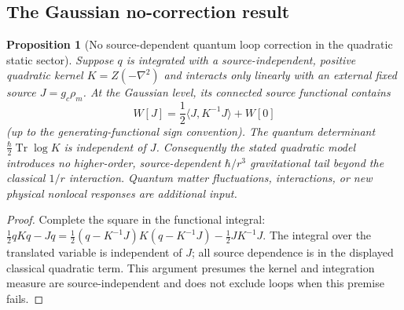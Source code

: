 \documentclass[11pt,a4paper]{article}
\newtheorem{proposition}[theorem]{Proposition}
\theoremstyle{remark}\newtheorem{remark}[theorem]{Remark}
\begin{document}
\subsection{The Gaussian no-correction result}
\begin{proposition}[No source-dependent quantum loop correction in the quadratic static sector]
Suppose $q$ is integrated with a source-independent, positive quadratic kernel
$K=Z(-\nabla^2)$ and interacts only linearly with an external fixed source
$J=g_c\rho_m$. At the Gaussian level, its connected source functional contains
\begin{equation}\label{eq:v31-gauss}
W[J]=\frac12\langle J,K^{-1}J\rangle+W[0]
\end{equation}
(up to the generating-functional sign convention). The quantum determinant
$\frac{\hbar}{2}\operatorname{Tr}\log K$ is independent of $J$.
Consequently the stated quadratic model introduces no higher-order,
source-dependent $\hbar/r^3$ gravitational tail beyond the classical
$1/r$ interaction. Quantum matter fluctuations, interactions, or new
physical nonlocal responses are additional input.
\end{proposition}
\begin{proof}
Complete the square in the functional integral:
$\frac12 qKq-Jq=\frac12(q-K^{-1}J)K(q-K^{-1}J)
-\frac12 JK^{-1}J$. The integral over the translated variable is
independent of $J$; all source dependence is in the displayed classical
quadratic term. This argument presumes the kernel and integration measure
are source-independent and does not exclude loops when this premise fails.
\end{proof}
\end{document}
